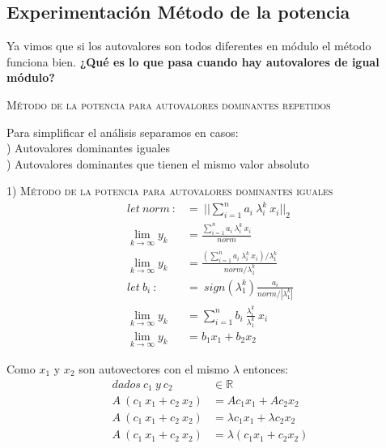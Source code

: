 
\vspace{1em}
\subsection{Experimentación Método de la potencia} 

\begin{large}  
    Ya vimos que si los autovalores son todos diferentes en módulo el método funciona bien. \textbf{¿Qué es lo que pasa cuando hay autovalores de igual módulo?}
\end{large}   


\vspace{2em}
\noindent \textsc{Método de la potencia para autovalores dominantes repetidos}

\vspace{2em}
\noindent Para simplificar el análisis separamos en casos: \\
) Autovalores dominantes iguales \\
) Autovalores dominantes que tienen el mismo valor absoluto
\vspace{2em}



\noindent \textsc{1) Método de la potencia para autovalores dominantes iguales}
\begin{align}
    let \ norm \ :&= \ ||\sum_{i=1}^{n} a_i \ \lambda_{i}^{k} \ x_i||_2 \\
    \lim_{k \to \infty} y_k &= \frac{\sum_{i=1}^{n} a_i \ \lambda_{i}^{k} \ x_i }{norm} \\ 
    \lim_{k \to \infty} y_k &= \frac{(\sum_{i=1}^{n} a_i \ \lambda_{i}^{k} \ x_i) / \lambda_{1}^{k}}{norm / \lambda_{1}^{k}} \\
    let \ b_i \ :&= \ sign(\lambda_{1}^{k}) \frac{a_i}{norm / |\lambda_{1}^{k}|} \\
    \lim_{k \to \infty} y_k &= \sum_{i=1}^{n} b_i \ \frac{\lambda_{i}^{k}}{\lambda_{1}^{k}} \ x_i \\
    \lim_{k \to \infty} y_k &= b_1 x_1 + b_2 x_2 
\end{align}

\vspace{1em}
\noindent Como $x_1$ y $x_2$ son autovectores con el mismo $\lambda$ entonces:
\begin{align}
    dados\ c_1 \ y \ c_2 &\in \mathbb{R} \\
    A \ (c_1 \ x_1 + c_2 \ x_2) &= A c_1 x_1 + A c_2 x_2 \\
    A \ (c_1 \ x_1 + c_2 \ x_2) &= \lambda c_1 x_1 + \lambda c_2 x_2 \\
    A \ (c_1 \ x_1 + c_2 \ x_2) &= \lambda (c_1 x_1 + c_2 x_2) 
\end{align}

